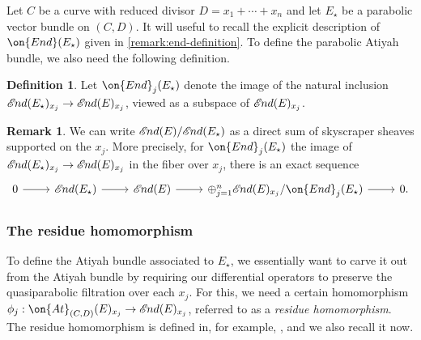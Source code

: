 \documentclass[12 pt]{amsart}
\theoremstyle{plain}
\theoremstyle{definition}
\newtheorem{definition}[subsubsection]{Definition}
\newtheorem{remark}[subsubsection]{Remark}
\theoremstyle{remark}
\numberwithin{equation}{section}
\newcommand*{\sheafend}{\mathscr{E}\kern -1pt nd}
\begin{document}
	Let $C$ be a curve with reduced divisor $D=x_1+\cdots+x_n$ and let $E_\star$ be a
	parabolic vector bundle on $(C,D)$.
	It will useful to recall the explicit description of $\on{End}(E_\star)$ given in
	\autoref{remark:end-definition}.
	To define the parabolic Atiyah bundle, we also need the following
	definition.

\begin{definition}
	\label{definition:}
	Let
$\on{End}_j(E_\star)$ denote the image of the natural inclusion
$\sheafend(E_\star)_{x_j} \to \sheafend(E)_{x_j}$, viewed as a subspace of $\sheafend(E)_{x_j}$.
\end{definition}

\begin{remark}
	\label{remark:}
	We can write $\sheafend(E)/\sheafend(E_\star)$ as a direct sum of skyscraper
sheaves supported on the $x_j$.
More precisely, for $\on{End}_j(E_\star)$ the image of
$\sheafend(E_\star)_{x_j} \to \sheafend(E)_{x_j}$ in the fiber over $x_j$,
there is an exact sequence
\begin{equation}
	\label{equation:}
	\begin{tikzcd}
		0 \ar {r} & \sheafend(E_\star) \ar {r} & \sheafend(E) \ar {r} &
		\oplus_{j= 1}^n \sheafend(E)_{x_j}/\on{End}_j(E_\star) \ar {r} &
		0.
\end{tikzcd}\end{equation}
\end{remark}

\subsubsection{The residue homomorphism}
\label{subsubsection:residue}
To define the Atiyah bundle associated to $E_\star$, we essentially want to
carve it out from the Atiyah bundle by requiring our differential operators to preserve the quasiparabolic
filtration over each $x_j$. For this, we need a certain homomorphism
${\phi}_j: \on{At}_{(C,D)}(E)_{x_j}
\to \sheafend(E)_{x_j}$,
referred to as a {\em residue homomorphism}.
The residue homomorphism is
defined in, for
example, \cite[(2.9)]{BHH:parabolic}, and we also recall it now.
\end{document}
